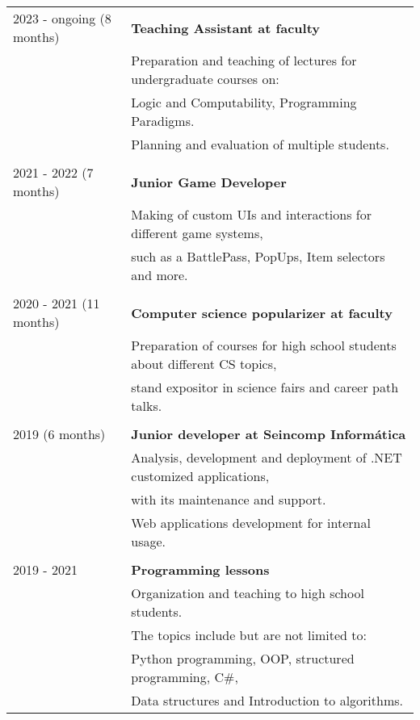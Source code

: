 \documentclass{article}
\begin{document}
\begin{tabular}{l | l}
    2023 - ongoing (8 months) & \textbf{Teaching Assistant at faculty} \\
                            & Preparation and teaching of lectures for undergraduate courses on: \\
                            & Logic and Computability, Programming Paradigms. \\ 
                            & Planning and evaluation of multiple students. \\
                            \\
    2021 - 2022 (7 months) & \textbf{Junior Game Developer} \\
                            & Making of custom UIs and interactions for different game systems, \\
                            & such as a BattlePass, PopUps, Item selectors and more. \\
                            \\
    2020 - 2021 (11 months) & \textbf{Computer science popularizer at faculty} \\
                            & Preparation of courses for high school students about different CS topics, \\ 
                            & stand expositor in science fairs and career path talks. \\
                            \\
    2019 (6 months) & \textbf{Junior developer at Seincomp Informática} \\
                    &  Analysis, development and deployment of .NET customized applications, \\ 
                    & with its maintenance and support. \\
                    & Web applications development for internal usage.\\
                    \\
    2019 - 2021     & \textbf{Programming lessons}  \\
                    & Organization and teaching to high school students. \\
                    & The topics include but are not limited to: \\ 
                    & Python programming, OOP, structured programming, C\#, \\ 
                    & Data structures and Introduction to algorithms.
\end{tabular}
\end{document}
